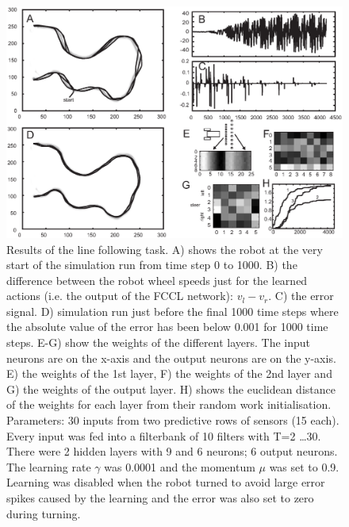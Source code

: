 \documentclass[Afour,sageh,times]{sagej}
\begin{document}
\begin{figure}[!ht]
  \centering
  \includegraphics[width=\linewidth]{line_results}
  \caption{Results of the line following task. A) shows the robot at
    the very start of the simulation run from time step 0 to 1000. B)
    the difference between the robot wheel speeds just for the learned
    actions (i.e. the output of the FCCL network): $v_l-v_r$.  C) the
    error signal.  D) simulation run just before the final 1000 time
    steps where the absolute value of the error has been below 0.001
    for 1000 time steps. E-G) show the weights of the different
    layers. The input neurons are on the x-axis and the output neurons
    are on the y-axis.  E) the weights of the 1st layer, F) the
    weights of the 2nd layer and G) the weights of the output layer.
    H) shows the euclidean distance of the weights for each layer from
    their random work initialisation. Parameters: 30 inputs from two
    predictive rows of sensors (15 each). Every input was fed into a
    filterbank of 10 filters with T=2 \ldots 30. There were 2 hidden
    layers with 9 and 6 neurons; 6 output neurons. The learning rate $\gamma$
    was 0.0001 and the momentum $\mu$ was set to 0.9. Learning was disabled
    when the robot turned to avoid large error spikes caused by the learning
    and the error was also set to zero during turning.
    \label{line_results}}
\end{figure}
\end{document}
